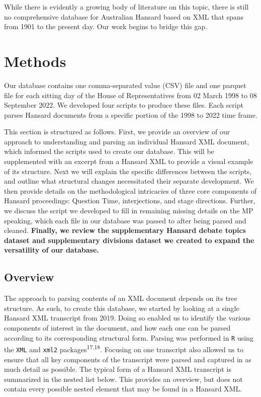 \documentclass[
  letterpaper,
  DIV=11,
  numbers=noendperiod]{scrartcl}
\begin{document}
While there is evidently a growing body of literature on this topic,
there is still no comprehensive database for Australian Hansard based on
XML that spans from 1901 to the present day. Our work begins to bridge
this gap.

\hypertarget{methods}{%
\section{Methods}\label{methods}}

Our database contains one comma-separated value (CSV) file and one
parquet file for each sitting day of the House of Representatives from
02 March 1998 to 08 September 2022. We developed four scripts to produce
these files. Each script parses Hansard documents from a specific
portion of the 1998 to 2022 time frame.

This section is structured as follows. First, we provide an overview of
our approach to understanding and parsing an individual Hansard XML
document, which informed the scripts used to create our database. This
will be supplemented with an excerpt from a Hansard XML to provide a
visual example of its structure. Next we will explain the specific
differences between the scripts, and outline what structural changes
necessitated their separate development. We then provide details on the
methodological intricacies of three core components of Hansard
proceedings: Question Time, interjections, and stage directions.
Further, we discuss the script we developed to fill in remaining missing
details on the MP speaking, which each file in our database was passed
to after being parsed and cleaned. \textbf{Finally, we review the
supplementary Hansard debate topics dataset and supplementary divisions
dataset we created to expand the versatility of our database.}

\hypertarget{sec-overview}{%
\subsection{Overview}\label{sec-overview}}

The approach to parsing contents of an XML document depends on its tree
structure. As such, to create this database, we started by looking at a
single Hansard XML transcript from 2019. Doing so enabled us to identify
the various components of interest in the document, and how each one can
be parsed according to its corresponding structural form. Parsing was
performed in \texttt{R} using the \texttt{XML} and \texttt{xml2}
packages\textsuperscript{17,18}. Focusing on one transcript also allowed
us to ensure that all key components of the transcript were parsed and
captured in as much detail as possible. The typical form of a Hansard
XML transcript is summarized in the nested list below. This provides an
overview, but does not contain every possible nested element that may be
found in a Hansard XML.
\end{document}
